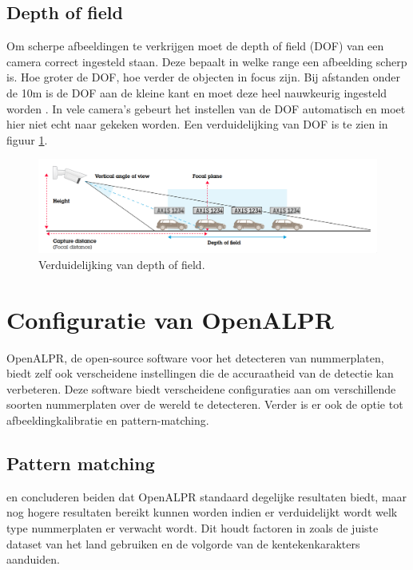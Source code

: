 \subsection{Depth of field}
Om scherpe afbeeldingen te verkrijgen moet de depth of field (DOF) van een camera correct ingesteld staan. Deze bepaalt in welke range een afbeelding scherp is. Hoe groter de DOF, hoe verder de objecten in focus zijn. Bij afstanden onder de 10m is de DOF aan de kleine kant en moet deze heel nauwkeurig ingesteld worden \autocite{axis2019license}. In vele camera's gebeurt het instellen van de DOF automatisch en moet hier niet echt naar gekeken worden. Een verduidelijking van DOF is te zien in figuur \ref{fig:dof}.

\begin{figure}[h!]
	\centering
	\includegraphics[width=\linewidth]{img/depth-of-field.png}
	\caption{Verduidelijking van depth of field. \autocite{axis2019license}}
	\label{fig:dof}
\end{figure}


\section{Configuratie van OpenALPR}

OpenALPR, de open-source software voor het detecteren van nummerplaten, biedt zelf ook verscheidene instellingen die de accuraatheid van de detectie kan verbeteren. Deze software biedt verscheidene configuraties aan om verschillende soorten nummerplaten over de wereld te detecteren. Verder is er ook de optie tot afbeeldingkalibratie en pattern-matching.

\subsection{Pattern matching}
\textcite{arrieta2019prototype} en \textcite{buhus2016automatic} concluderen beiden dat OpenALPR standaard degelijke resultaten biedt, maar nog hogere resultaten bereikt kunnen worden indien er verduidelijkt wordt welk type nummerplaten er verwacht wordt. Dit houdt factoren in zoals de juiste dataset van het land gebruiken en de volgorde van de kentekenkarakters aanduiden.

